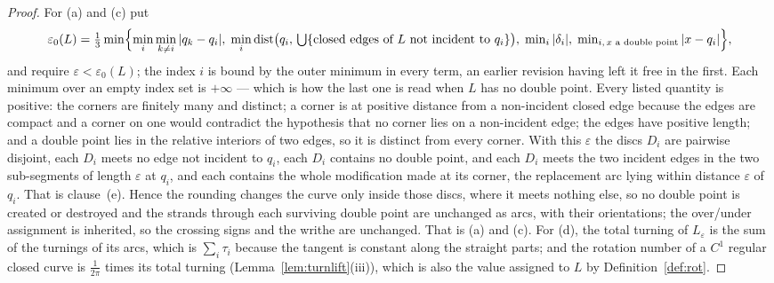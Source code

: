 \begin{proof}
For (a) and (c) put
\[
   \varepsilon_0(L)=\tfrac13\min\Bigl\{
 \min_{i}\min_{k\neq i}|q_k-q_i|,\;
 \min_{i}\operatorname{dist}\bigl(q_i,\,\textstyle\bigcup\{\text{closed edges of }L\text{ not incident to }q_i\}\bigr),\;
 \min_i|\delta_i|,\;
 \min_{i,\,x\text{ a double point}}|x-q_i|
\Bigr\},
\]
and require $\varepsilon<\varepsilon_0(L)$; the index $i$ is bound by the outer
minimum in every term, an earlier revision having left it free in the first.
Each minimum over an empty index set is $+\infty$ --- which is how the last
one is read when $L$ has no double point. Every listed quantity is positive: the
corners are finitely many and distinct; a corner is at positive distance from a
non-incident closed edge because the edges are compact and a corner on one would
contradict the hypothesis that no corner lies on a non-incident edge; the edges have positive length; and a double point lies
in the relative interiors of two edges, so it is distinct from every corner.
With this $\varepsilon$ the discs $D_i$ are pairwise disjoint, each $D_i$ meets
no edge not incident to $q_i$, each $D_i$ contains no double point, and each
$D_i$ meets the two incident edges in the two sub-segments of length
$\varepsilon$ at $q_i$, and each contains the whole modification made at its
corner, the replacement arc lying within distance $\varepsilon$ of $q_i$. That
is clause~(e). Hence the rounding changes the curve only inside those
discs, where it meets nothing else, so no double point is created or destroyed
and the strands through each surviving double point are unchanged as arcs, with
their orientations; the over/under assignment is inherited, so the crossing signs
and the writhe are unchanged. That is (a) and (c). For (d), the total turning of
$L_\varepsilon$ is the sum of the turnings of its arcs, which is
$\sum_i\tau_i$ because the tangent is constant along the straight parts; and the
rotation number of a $C^1$ regular closed curve is $\frac1{2\pi}$ times its
total turning (Lemma~\ref{lem:turnlift}(iii)), which is also the value assigned to $L$
by Definition~\ref{def:rot}.
\end{proof}

